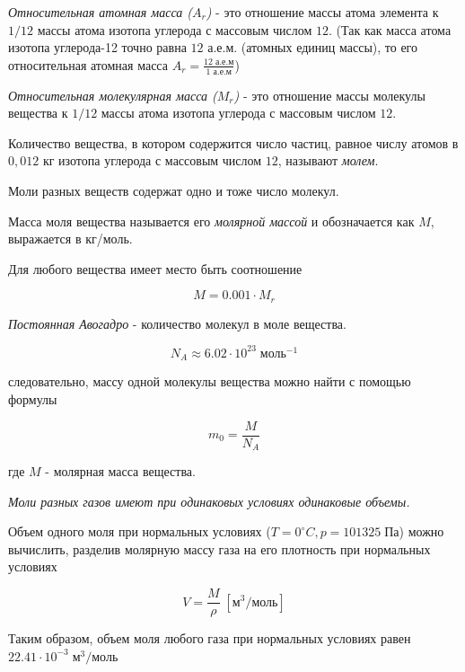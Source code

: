 \documentclass[a4paper,12pt]{article}
\begin{document}
		\textit{Относительная атомная масса ($A_r$)} - это отношение массы атома элемента к
		$1/12$ массы атома изотопа углерода с массовым числом $12$. (Так как масса атома 
		изотопа углерода-12 точно равна $12 \text{ а.е.м.}$ (атомных единиц массы), то его 
		относительная атомная масса $A_r = \frac{12 \text{ а.е.м}}{1 \text{ а.е.м}}$)

		\textit{Относительная молекулярная масса ($M_r$)} - это отношение массы молекулы
		вещества к $1/12$ массы атома изотопа углерода с массовым числом $12$.

		Количество вещества, в котором содержится число частиц, равное числу атомов в
		$0,012$ кг изотопа углерода с массовым числом $12$, называют \textit{молем}.

		Моли разных веществ содержат одно и тоже число молекул.

		Масса моля вещества называется его \textit{молярной массой} и обозначается 
		как $M$, выражается в кг/моль.

		Для любого вещества имеет место быть соотношение

		\begin{equation*}
			M = 0.001 \cdot M_r
		\end{equation*}

		\textit{Постоянная Авогадро} - количество молекул в моле вещества.

		\begin{equation*}
			N_A \approx 6.02 \cdot 10^{23} \; \text{моль}^{-1}
		\end{equation*}

		следовательно, массу одной молекулы вещества можно найти с помощью формулы

		\begin{equation}
			m_0 = \frac{M}{N_A}
		\end{equation}

		где $M$ - молярная масса вещества.

		\textit{Моли разных газов имеют при одинаковых условиях одинаковые объемы.}

		Объем одного моля при нормальных условиях ($T = 0^\circ C, p = 101325 \; \text{Па}$)
		можно вычислить, разделив молярную массу газа на его плотность при нормальных
		условиях

		\begin{equation}
			V = \frac{M}{\rho} \; [\text{м}^3 / \text{моль}]
		\end{equation}

		Таким образом, объем моля любого газа при нормальных условиях равен $22.41 \cdot 10^{-3}
		\; \text{м}^3 / \text{моль}$
\end{document}
